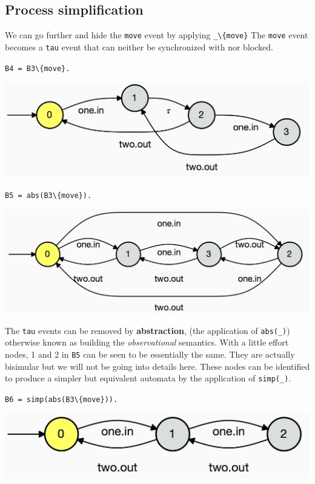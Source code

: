 \documentclass[]{article}
\begin{document}
\subsection{Process simplification}
We can go further and hide the \verb$move$ event  by applying \verb$_\{move}$ The \verb$move$ event  becomes a \verb$tau$ event that can neither  be synchronized with nor blocked.

\begin{minipage}{0.45\textwidth}
\noindent\begin{center}\verb$B4 = B3\{move}.$

 \includegraphics[scale=0.15]{B4.jpg} \end{center}
 \end{minipage}
\begin{minipage}{0.45\textwidth}
\noindent\begin{center}\verb$B5 = abs(B3\{move}).$

 \includegraphics[scale=0.15]{B5.jpg} \end{center}
 \end{minipage}

The \verb$tau$ events  can be removed by {\bf abstraction}, (the application of \verb$abs(_)$) otherwise known as building the \emph{observational} semantics.  With a little effort nodes, 1 and 2 in \verb$B5$ can be seen to be  essentially the same.  They are actually bisimular but we will not be going into details here. These nodes can be identified to produce a simpler but equivalent automata by the application of \verb$simp(_)$.



\noindent\begin{center}\verb$B6 = simp(abs(B3\{move})).$

 \includegraphics[scale=0.15]{B6.jpg} \end{center}
\end{document}
